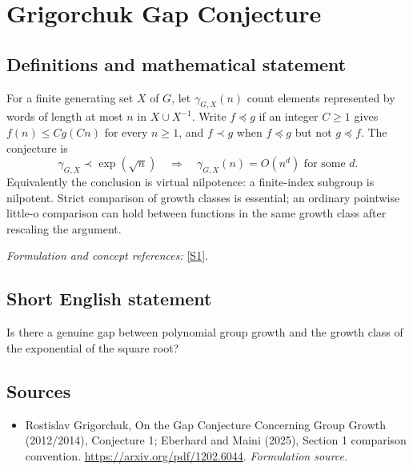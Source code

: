 \documentclass[11pt]{article}
\begin{document}
\section*{\texorpdfstring{Grigorchuk Gap Conjecture}{Grigorchuk Gap Conjecture}}\label{282}
\subsection{Definitions and mathematical statement}
For a finite generating set $X$ of $G$, let $\gamma_{G,X}(n)$ count elements represented by words of length at most $n$ in $X\cup X^{-1}$. Write $f\preceq g$ if an integer $C\ge1$ gives $f(n)\le Cg(Cn)$ for every $n\ge1$, and $f\prec g$ when $f\preceq g$ but not $g\preceq f$. The conjecture is
\[
 \gamma_{G,X}\prec\exp(\sqrt n)\quad\Longrightarrow\quad
 \gamma_{G,X}(n)=O(n^d)\text{ for some }d.
\]
Equivalently the conclusion is virtual nilpotence: a finite-index subgroup is nilpotent. Strict comparison of growth classes is essential; an ordinary pointwise little-o comparison can hold between functions in the same growth class after rescaling the argument.
\par\smallskip\textit{Formulation and concept references:} \href{https://arxiv.org/pdf/1202.6044}{[S1]}.

\subsection{Short English statement}
Is there a genuine gap between polynomial group growth and the growth class of the exponential of the square root?
\subsection{Sources}
\begin{itemize}
\item[S1]Rostislav Grigorchuk, On the Gap Conjecture Concerning Group Growth (2012/2014), Conjecture 1; Eberhard and Maini (2025), Section 1 comparison convention.
\url{https://arxiv.org/pdf/1202.6044}.
\textit{Formulation source.}
\end{itemize}
\end{document}

